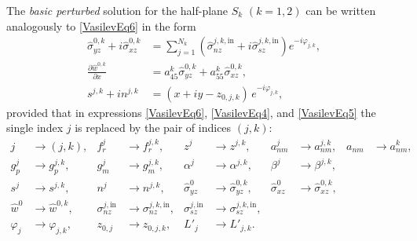 The \emph{basic perturbed} solution for the half-plane $S_k$ $(k=1,2)$ can be written analogously to \eqref{VasilevEq6} in the form
\begin{equation}
	\begin{aligned}
\widehat{\sigma}_{yz}^{0,k}
+i\widehat{\sigma}_{xz}^{0,k}
&=
\sum_{j=1}^{N_k}
\left(
\widehat{\sigma}_{nz}^{j,k,\mathrm{in}}
+i\widehat{\sigma}_{sz}^{j,k,\mathrm{in}}
\right)
e^{-i\varphi_{j,k}},
\\
\frac{\partial \widehat{w}^{0,k}}{\partial x}
&=
a_{45}^{k}\widehat{\sigma}_{yz}^{0,k}
+
a_{55}^{k}\widehat{\sigma}_{xz}^{0,k},
\\
	s^{j,k}+in^{j,k}
	&=
	(x+iy-z_{0,j,k})\,e^{-i\varphi_{j,k}},
\end{aligned}
	\label{VasilevEq13}
	\end{equation}
%
provided that in expressions \eqref{VasilevEq6}, \eqref{VasilevEq4}, and \eqref{VasilevEq5} the single index $j$ is replaced by the pair of indices $(j,k)$:
\begin{align*}
	j &\to (j,k), &
	f_r^{j} &\to f_r^{j,k}, &
	z^{j} &\to z^{j,k}, &
	a_{nm}^{j} &\to a_{nm}^{j,k}, &
	a_{nm} &\to a_{nm}^{k}, \\
	g_p^{j} &\to g_p^{j,k}, &
	g_m^{j} &\to g_m^{j,k}, &
	\alpha^{j} &\to \alpha^{j,k}, &
	\beta^{j} &\to \beta^{j,k}, \\
	s^{j} &\to s^{j,k}, &
	n^{j} &\to n^{j,k}, &
	\widehat{\sigma}_{yz}^{0} &\to \widehat{\sigma}_{yz}^{0,k}, &
	\widehat{\sigma}_{xz}^{0} &\to \widehat{\sigma}_{xz}^{0,k}, \\
	\widehat{w}^{0} &\to \widehat{w}^{0,k}, &
	\sigma_{nz}^{j,\mathrm{in}} &\to \sigma_{nz}^{j,k,\mathrm{in}}, &
	\sigma_{sz}^{j,\mathrm{in}} &\to \sigma_{sz}^{j,k,\mathrm{in}}, \\
	\varphi_{j} &\to \varphi_{j,k}, &
	z_{0,j} &\to z_{0,j,k}, &
	L'_j &\to L'_{j,k}.
\end{align*}

